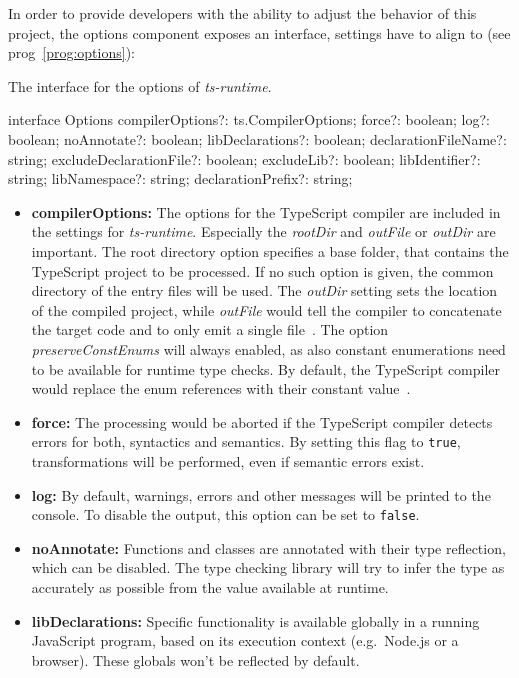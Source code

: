 In order to provide developers with the ability to adjust the behavior of this project, the options component exposes an interface, settings have to align to (see prog~\ref{prog:options}):
\begin{program}
\caption{The interface for the options of \emph{ts-runtime}.}
\label{prog:options}
\begin{JsCode}
interface Options {
  compilerOptions?: ts.CompilerOptions;
  force?: boolean;
  log?: boolean;
  noAnnotate?: boolean;
  libDeclarations?: boolean;
  declarationFileName?: string;
  excludeDeclarationFile?: boolean;
  excludeLib?: boolean;
  libIdentifier?: string;
  libNamespace?: string;
  declarationPrefix?: string;
}
\end{JsCode}
\end{program}
\begin{itemize}
  \item \textbf{compilerOptions:} The options for the TypeScript compiler are included in the settings for \emph{ts-runtime}. Especially the \emph{rootDir} and \emph{outFile} or \emph{outDir} are important. The root directory option specifies a base folder, that contains the TypeScript project to be processed. If no such option is given, the common directory of the entry files will be used. The \emph{outDir} setting sets the location of the compiled project, while \emph{outFile} would tell the compiler to concatenate the target code and to only emit a single file~\cite{TypeScriptHandbook:CompilerOptions}. The option \emph{preserveConstEnums} will always enabled, as also constant enumerations need to be available for runtime type checks. By default, the TypeScript compiler would replace the enum references with their constant value~\cites{TypeScriptHandbook:CompilerOptions, TypeScriptSpec:ConstEnums}.
  \item \textbf{force:} The processing would be aborted if the TypeScript compiler detects errors for both, syntactics and semantics. By setting this flag to \texttt{true}, transformations will be performed, even if semantic errors exist.
  \item \textbf{log:} By default, warnings, errors and other messages will be printed to the console. To disable the output, this option can be set to \texttt{false}.
  \item \textbf{noAnnotate:} Functions and classes are annotated with their type reflection, which can be disabled. The type checking library will try to infer the type as accurately as possible from the value available at runtime.
  \item \textbf{libDeclarations:} Specific functionality is available globally in a running JavaScript program, based on its execution context (e.g.\ Node.js or a browser). These globals won't be reflected by default.

\end{itemize}
